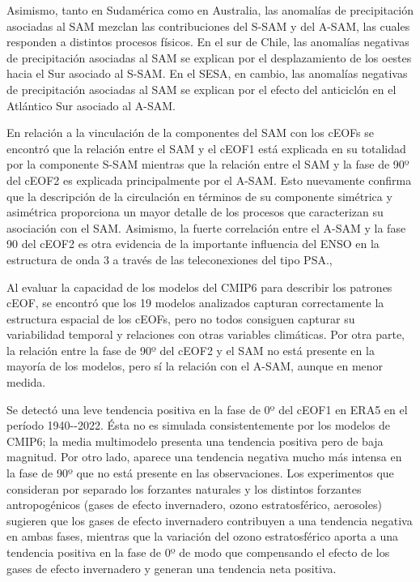 \documentclass[12pt,oneside,a4paper]{reedthesis}
\begin{document}
Asimismo, tanto en Sudamérica como en Australia, las anomalías de precipitación asociadas al SAM mezclan las contribuciones del S-SAM y del A-SAM, las cuales responden a distintos procesos físicos.
En el sur de Chile, las anomalías negativas de precipitación asociadas al SAM se explican por el desplazamiento de los oestes hacia el Sur asociado al S-SAM.
En el SESA, en cambio, las anomalías negativas de precipitación asociadas al SAM se explican por el efecto del anticiclón en el Atlántico Sur asociado al A-SAM.~

En relación a la vinculación de la componentes del SAM con los cEOFs se encontró que la relación entre el SAM y el cEOF1 está explicada en su totalidad por la componente S-SAM mientras que la relación entre el SAM y la fase de 90º del cEOF2 es explicada principalmente por el A-SAM.
Esto nuevamente confirma que la descripción de la circulación en términos de su componente simétrica y asimétrica proporciona un mayor detalle de los procesos que caracterizan su asociación con el SAM.
Asimismo, la fuerte correlación entre el A-SAM y la fase 90 del cEOF2 es otra evidencia de la importante influencia del ENSO en la estructura de onda 3 a través de las teleconexiones del tipo PSA.,

Al evaluar la capacidad de los modelos del CMIP6 para describir los patrones cEOF, se encontró que los 19 modelos analizados capturan correctamente la estructura espacial de los cEOFs, pero no todos consiguen capturar su variabilidad temporal y relaciones con otras variables climáticas.
Por otra parte, la relación entre la fase de 90º del cEOF2 y el SAM no está presente en la mayoría de los modelos, pero sí la relación con el A-SAM, aunque en menor medida.

Se detectó una leve tendencia positiva en la fase de 0º del cEOF1 en ERA5 en el período 1940-\/-2022.
Ésta no es simulada consistentemente por los modelos de CMIP6; la media multimodelo presenta una tendencia positiva pero de baja magnitud.
Por otro lado, aparece una tendencia negativa mucho más intensa en la fase de 90º que no está presente en las observaciones.
Los experimentos que consideran por separado los forzantes naturales y los distintos forzantes antropogénicos (gases de efecto invernadero, ozono estratosférico, aerosoles) sugieren que los gases de efecto invernadero contribuyen a una tendencia negativa en ambas fases, mientras que la variación del ozono estratosférico aporta a una tendencia positiva en la fase de 0º de modo que compensando el efecto de los gases de efecto invernadero y generan una tendencia neta positiva.
\end{document}

